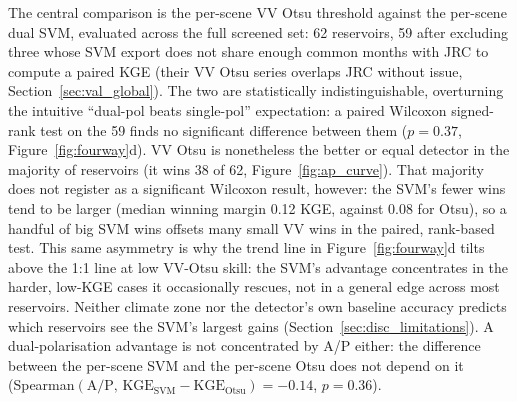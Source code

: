 The central comparison is the per-scene VV Otsu threshold against the
per-scene dual SVM, evaluated across the full screened set: 62 reservoirs,
59 after excluding three whose SVM export does not share enough common
months with JRC to compute a paired KGE (their VV Otsu series overlaps JRC
without issue, Section~\ref{sec:val_global}). The two are statistically
indistinguishable, overturning the intuitive ``dual-pol beats single-pol''
expectation: a paired Wilcoxon signed-rank test on the 59 finds no
significant difference between them ($p = 0.37$,
Figure~\ref{fig:fourway}d). VV Otsu is nonetheless the better or equal
detector in the majority of reservoirs (it wins 38 of 62,
Figure~\ref{fig:ap_curve}). That majority does not register as a
significant Wilcoxon result, however: the SVM's fewer wins tend to be
larger (median winning margin 0.12 KGE, against 0.08 for Otsu), so a
handful of big SVM wins offsets many small VV wins in the paired,
rank-based test. This same asymmetry is
why the trend line in Figure~\ref{fig:fourway}d tilts above the 1:1 line at
low VV-Otsu skill: the SVM's advantage concentrates in the harder,
low-KGE cases it occasionally rescues, not in a general edge across most
reservoirs. Neither climate zone nor the detector's own baseline accuracy
predicts which reservoirs see the SVM's largest gains
(Section~\ref{sec:disc_limitations}). A dual-polarisation advantage is not
concentrated by A/P either: the difference between the per-scene SVM and
the per-scene Otsu does not depend on it
(Spearman$(\text{A/P},\,\text{KGE}_{\text{SVM}}-\text{KGE}_{\text{Otsu}}) =
-0.14$, $p = 0.36$).

